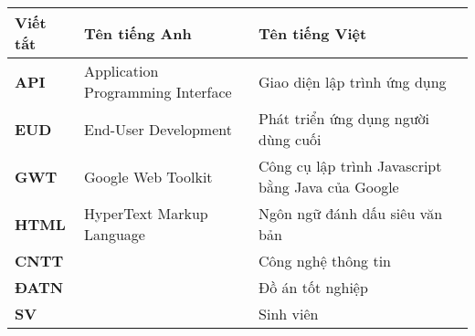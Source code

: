 \documentclass[../BTL.tex]{subfiles}
\begin{document}
\begin{longtable}{l p{6cm} p{7cm}}
	\hline
   \textbf{Viết tắt}  & \textbf{Tên tiếng Anh}	& \textbf{Tên tiếng Việt} \\ \hline 
	\textbf{API} & Application Programming Interface & Giao diện lập trình ứng dụng\\
	\textbf{EUD} & End-User Development & Phát triển ứng dụng người dùng cuối\\
	\textbf{GWT} & Google Web Toolkit & Công cụ lập trình Javascript bằng Java của Google\\
	\textbf{HTML} & HyperText Markup Language & Ngôn ngữ đánh dấu siêu văn bản\\
	\textbf{CNTT }  &   & Công nghệ thông tin\\
	\textbf{ĐATN} &  & Đồ án tốt nghiệp \\
	\textbf{SV} &  & Sinh viên \\

    \hline
\end{longtable}
\end{document}
